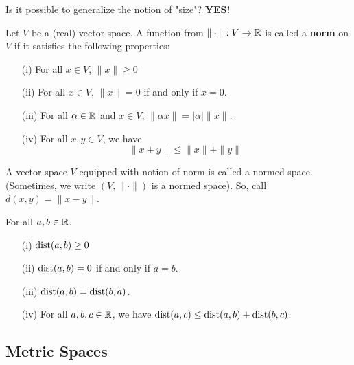 \documentclass[a4paper]{report}
\begin{document}
Is it possible to generalize the notion of "size"? \textbf{YES!}

\begin{definition}[ ]
    Let \( V  \) be a (real) vector space. A function from \( \| \cdot \|:   V \to \mathbb{R}  \) is called a \textbf{norm} on \( V  \) if it satisfies the following properties:
    \begin{enumerate}
        \item[(i)] For all \( x \in V  \), \( \|x \| \geq 0  \) 
        \item[(ii)] For all \( x \in V  \), \( \|x \| = 0  \) if and only if \( x = 0  \).
        \item[(iii)] For all \( \alpha \in \mathbb{R}  \) and \( x \in V  \), \( \| \alpha x \| = | \alpha |  \|x\| \).
        \item[(iv)] For all \( x,y \in V  \), we have
            \[  \|x + y \| \leq \|x\| + \|y\| \ \tag{triangle inequality} \]
\end{enumerate}
A vector space \( V  \) equipped with notion of norm is called a normed space. (Sometimes, we write \( (V , \|\cdot\|) \) is a normed space). So, call \( d(x,y) = \| x - y \| \).
\end{definition}

\begin{theorem}
    For all \( a,b \in \mathbb{R}  \). 
    \begin{enumerate}
        \item[(i)] \( \operatorname{dist}(a,b) \geq 0  \) 
        \item[(ii)] \( \operatorname{dist}(a,b) = 0  \) if and only if \( a = b  \).
        \item[(iii)] \( \operatorname{dist}(a,b) = \operatorname{dist}(b,a)  \).
        \item[(iv)] For all \( a,b,c \in \mathbb{R}   \), we have  \( \operatorname{dist}(a,c) \leq \operatorname{dist}(a,b) + \operatorname{dist}(b,c) \).
    \end{enumerate}
\end{theorem}

\subsection{Metric Spaces}
\end{document}
